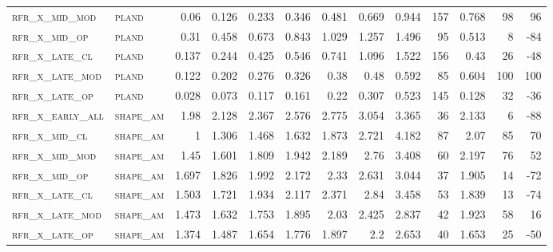 \begin{landscape}
\begin{center}
\begin{footnotesize}
\begin{longtable}{llrrrrrrrr|rrr}
\textsc{rfr\_x\_mid\_mod  } & \textsc{pland     }   & 0.06    & 0.126   & 0.233   & 0.346    & 0.481    & 0.669    & 0.944    & 157    & 0.768         & 98            & 96              \\
\textsc{rfr\_x\_mid\_op   } & \textsc{pland     }   & 0.31    & 0.458   & 0.673   & 0.843    & 1.029    & 1.257    & 1.496    & 95     & 0.513         & 8             & -84             \\
\textsc{rfr\_x\_late\_cl  } & \textsc{pland     }   & 0.137   & 0.244   & 0.425   & 0.546    & 0.741    & 1.096    & 1.522    & 156    & 0.43          & 26            & -48             \\
\textsc{rfr\_x\_late\_mod } & \textsc{pland     }   & 0.122   & 0.202   & 0.276   & 0.326    & 0.38     & 0.48     & 0.592    & 85     & 0.604         & 100           & 100             \\
\textsc{rfr\_x\_late\_op  } & \textsc{pland     }   & 0.028   & 0.073   & 0.117   & 0.161    & 0.22     & 0.307    & 0.523    & 145    & 0.128         & 32            & -36             \\
\textsc{rfr\_x\_early\_all} & \textsc{shape\_am }   & 1.98    & 2.128   & 2.367   & 2.576    & 2.775    & 3.054    & 3.365    & 36     & 2.133         & 6             & -88             \\
\textsc{rfr\_x\_mid\_cl   } & \textsc{shape\_am }   & 1       & 1.306   & 1.468   & 1.632    & 1.873    & 2.721    & 4.182    & 87     & 2.07          & 85            & 70              \\
\textsc{rfr\_x\_mid\_mod  } & \textsc{shape\_am }   & 1.45    & 1.601   & 1.809   & 1.942    & 2.189    & 2.76     & 3.408    & 60     & 2.197         & 76            & 52              \\
\textsc{rfr\_x\_mid\_op   } & \textsc{shape\_am }   & 1.697   & 1.826   & 1.992   & 2.172    & 2.33     & 2.631    & 3.044    & 37     & 1.905         & 14            & -72             \\
\textsc{rfr\_x\_late\_cl  } & \textsc{shape\_am }   & 1.503   & 1.721   & 1.934   & 2.117    & 2.371    & 2.84     & 3.458    & 53     & 1.839         & 13            & -74             \\
\textsc{rfr\_x\_late\_mod } & \textsc{shape\_am }   & 1.473   & 1.632   & 1.753   & 1.895    & 2.03     & 2.425    & 2.837    & 42     & 1.923         & 58            & 16              \\
\textsc{rfr\_x\_late\_op  } & \textsc{shape\_am }   & 1.374   & 1.487   & 1.654   & 1.776    & 1.897    & 2.2      & 2.653    & 40     & 1.653         & 25            & -50             \\

\end{longtable}
\end{footnotesize}
\end{center}
\end{landscape}
